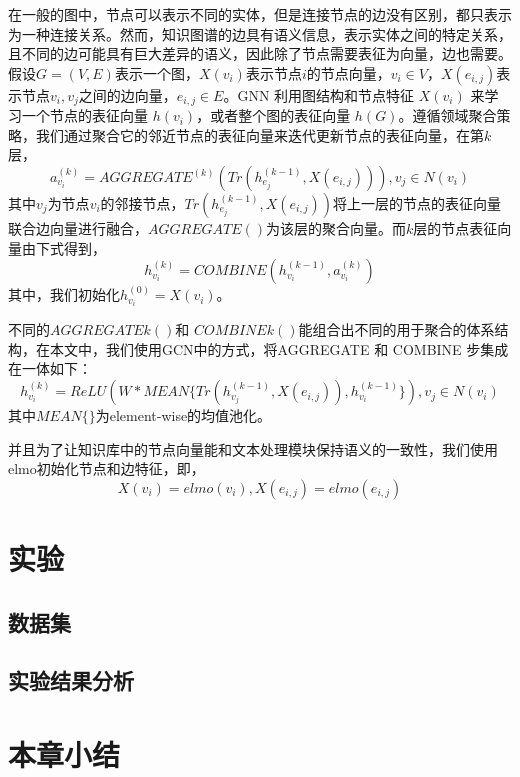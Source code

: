 在一般的图中，节点可以表示不同的实体，但是连接节点的边没有区别，都只表示为一种连接关系。然而，知识图谱的边具有语义信息，表示实体之间的特定关系，且不同的边可能具有巨大差异的语义，因此除了节点需要表征为向量，边也需要。假设$G = (V, E)$表示一个图，$X(v_i)$表示节点$i$的节点向量，$v_i \in V $，$X(e_{i,j})$表示节点$v_i, v_j$之间的边向量，$e_{i,j} \in E$。GNN 利用图结构和节点特征 $X(v_i)$ 来学习一个节点的表征向量 $h(v_i)$，或者整个图的表征向量 $h(G)$。遵循领域聚合策略，我们通过聚合它的邻近节点的表征向量来迭代更新节点的表征向量，在第$k$层，
\begin{equation}
a_{v_i}^{(k)} = AGGREGATE^{(k)}(Tr(h_{e_j}^{(k-1)}, X(e_{i,j}))), v_j \in N(v_i)
\end{equation}
其中$v_j$为节点$v_i$的邻接节点，$Tr(h_{e_j}^{(k-1)}, X(e_{i,j}))$将上一层的节点的表征向量联合边向量进行融合，$AGGREGATE()$为该层的聚合向量。而$k$层的节点表征向量由下式得到，
\begin{equation}
h_{v_i}^{(k)} = COMBINE(h_{v_i}^{(k-1)}, a_{v_i}^{(k)})
\end{equation}
其中，我们初始化$h_{v_i}^{(0)}=X(v_i)$。

不同的$AGGREGATE{k}() $和 $COMBINE{k}() $能组合出不同的用于聚合的体系结构，在本文中，我们使用GCN中的方式，将AGGREGATE 和 COMBINE 步集成在一体如下：
\begin{equation}
h_{v_i}^{(k)} = ReLU(W*MEAN\{Tr(h_{v_j}^{(k-1)}, X(e_{i,j})), h_{v_i}^{(k-1)}\}), v_j \in N(v_i)
\end{equation}
其中$MEAN\{\}$为element-wise的均值池化。

并且为了让知识库中的节点向量能和文本处理模块保持语义的一致性，我们使用elmo初始化节点和边特征，即，
\begin{equation}
X(v_i) = elmo(v_i),
X(e_{i,j}) = elmo(e_{i,j})
\end{equation}

\section{实验}
\subsection{数据集}
\subsection{实验结果分析}

\section{本章小结}

